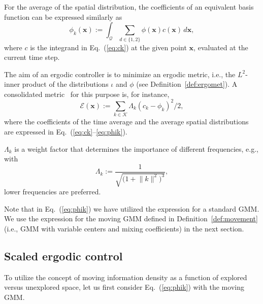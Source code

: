 \documentclass[letterpaper,10pt,conference,twoside]{IEEEtran}
\theoremstyle{definition}
\begin{document}
For the average of the spatial distribution, the coefficients of an equivalent basis function can be expressed similarly as 
\begin{equation}\label{eq:phik}
  \phi_k(\mathbf{x}):=\int_{\mathcal{Q}}{\sum_{d\in\{1,2\}}}{\phi(\mathbf{x})c(\mathbf{x})\,d\mathbf{x}},
\end{equation}
where $c$ is the integrand in Eq.~(\ref{eq:ck}) at the given point $\mathbf{x}$, evaluated at the current time step.

The aim of an ergodic controller is to minimize an ergodic metric, i.e., the $L^2$-inner product of the distributions $\iota$ and $\phi$ (see Definition~\ref{def:ergomet}). A consolidated metric~\cite{abraham2017ergodic,abraham2021ergodic,seewald2024energy,lerch2023safety,abraham2018decentralized,dong2023time} for this purpose is, for instance, \begin{equation}
  \mathcal{E}(\mathbf{x}):=\sum_{k\in\mathcal{K}}{\Lambda_k(c_k-\phi_k)^2/2},
\end{equation}
where the coefficients of the time average and the average spatial distributions are expressed in Eq.~(\ref{eq:ck}--\ref{eq:phik}).

$\Lambda_k$ is a weight factor that determines the importance of different frequencies, e.g., with
\begin{equation}
  \Lambda_k:=\frac{1}{\sqrt{\big(1+\lVert{k}\rVert^2\big)^3}},
\end{equation}
lower frequencies are preferred.

Note that in Eq.~(\ref{eq:phik}) we have utilized the expression for a standard GMM. 
We use the expression for the moving GMM defined in Definition~\ref{def:movement} (i.e., GMM with variable centers and mixing coefficients) in the next section.


\subsection{Scaled ergodic control}
\label{sec:sol}
\noindent
To utilize the concept of moving information density as a function of explored versus unexplored space, let us first consider Eq.~(\ref{eq:phik}) with the moving GMM.
\end{document}
